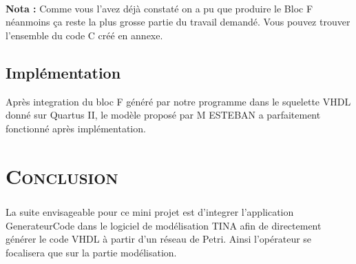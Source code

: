 \textbf{\\Nota :} Comme vous l'avez déjà constaté on a pu que produire le Bloc F néanmoins ça reste la plus grosse partie du travail demandé. Vous pouvez trouver l'ensemble du code C créé en annexe.

\section{Implémentation}
\par Après integration du bloc F généré par notre programme dans le squelette VHDL donné sur Quartus II, le modèle proposé par M ESTEBAN a parfaitement fonctionné après implémentation.

\chapter*{\textsc{Conclusion}}

	\paragraph{} La suite envisageable pour ce mini projet est d'integrer l'application GenerateurCode dans le logiciel de modélisation TINA afin de directement générer le code VHDL à partir d'un réseau de Petri. Ainsi l'opérateur se focalisera que sur la partie modélisation.   